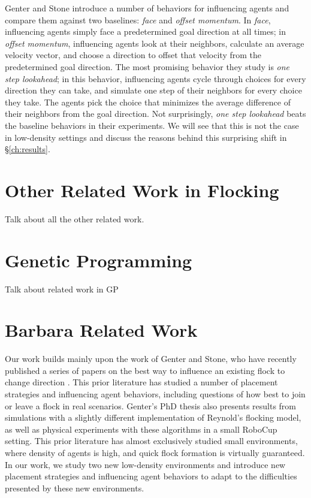 Genter and Stone introduce a number of behaviors for influencing agents and
compare them against two baselines: \textit{face} and \textit{offset momentum}.
In \textit{face}, influencing agents simply face a predetermined goal direction
at all times; in \textit{offset momentum}, influencing agents look at their
neighbors, calculate an average velocity vector, and choose a direction to
offset that velocity from the predetermined goal direction.
The most promising behavior they study is \textit{one step lookahead}; in this
behavior, influencing agents cycle through choices for every direction they
can take, and simulate one step of their neighbors for every choice they take.
The agents pick the choice that minimizes the average difference of their
neighbors from the goal direction.
Not surprisingly, \textit{one step lookahead} beats the baseline behaviors in
their experiments.
We will see that this is not the case in low-density settings and discuss the
reasons behind this surprising shift in \S\ref{ch:results}.

\section{Other Related Work in Flocking}
Talk about all the other related work.

\section{Genetic Programming}
Talk about related work in GP

\section{Barbara Related Work}
Our work builds mainly upon the work of Genter and Stone, who have recently
published a series of papers on the best way to influence an existing flock to
change direction \cite{genter2015placement, genter2014neighborsorientherd,
genter2013visionstationary, genter2013backsearch,
genter2016facegoalfacecurrent, genter201612steplookahead}.
This prior literature has studied a number of placement strategies and
influencing agent behaviors, including questions of how best to join or leave a
flock in real scenarios.
Genter's PhD thesis also presents results from simulations with a slightly
different implementation of Reynold's flocking model, as well as physical
experiments with these algorithms in a small RoboCup setting.
This prior literature has almost exclusively studied small environments, where
density of agents is high, and quick flock formation is virtually guaranteed.
In our work, we study two new low-density environments and introduce new
placement strategies and influencing agent behaviors to adapt to the
difficulties presented by these new environments.

